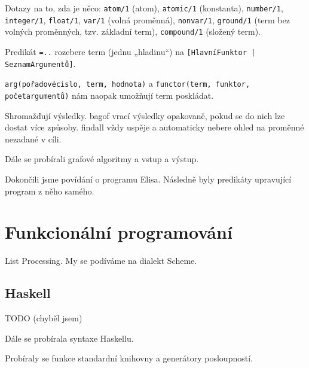 \documentclass[12pt]{article}					%
\begin{document}
\begin{definice}
	Dotazy na to, zda je něco: \verb|atom/1| (atom), \verb|atomic/1| (konstanta), \verb|number/1|, \verb|integer/1|, \verb|float/1|, \verb|var/1| (volná proměnná), \verb|nonvar/1|, \verb|ground/1| (term bez volných proměnných, tzv. základní term), \verb|compound/1| (složený term).
\end{definice}

\begin{definice}[univ]
	Predikát \verb|=..| rozebere term (jednu „hladinu“) na \verb![HlavníFunktor | SeznamArgumentů]!.
\end{definice}

\begin{definice}
	\verb|arg(pořadovécislo, term, hodnota)| a \verb|functor(term, funktor, početargumentů)| nám naopak umožňují term poskládat.
\end{definice}

\begin{definice}
	Shromažďují výsledky. bagof vrací výsledky opakovaně, pokud se do nich lze dostat více způsoby. findall vždy uspěje a automaticky nebere ohled na proměnné nezadané v cíli.
\end{definice}


Dále se probírali grafové algoritmy a vstup a výstup.


Dokončili jsme povídání o programu Elisa. Následně byly predikáty upravující program z něho samého.

\section{Funkcionální programování}
\begin{definice}[LISP]
	List Processing. My se podíváme na dialekt Scheme.
\end{definice}

\subsection{Haskell}


TODO (chyběl jsem)


\begin{poznamka}
	Dále se probírala syntaxe Haskellu.
\end{poznamka}


\begin{poznamka}
	Probíraly se funkce standardní knihovny a generátory posloupností.
\end{poznamka}
	
\end{document}
